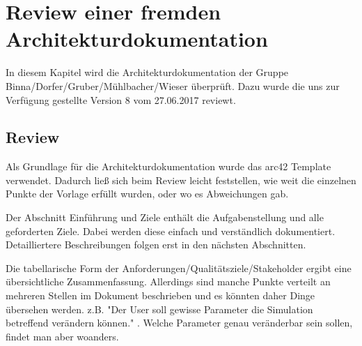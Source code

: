 
\chapter{Review einer fremden Architekturdokumentation}
\label{Review_einer_fremden_Architekturdokumentation}

In diesem Kapitel wird die Architekturdokumentation der Gruppe Binna/Dorfer/Gruber/Mühlbacher/Wieser überprüft.
Dazu wurde die uns zur Verfügung gestellte Version 8 vom 27.06.2017 reviewt.

\thispagestyle{standard}
\pagestyle{standard}

\section{Review}
\label{Review}

Als Grundlage für die Architekturdokumentation wurde das arc42 Template verwendet. Dadurch ließ sich beim Review leicht feststellen, wie weit die einzelnen Punkte der Vorlage erfüllt wurden, oder wo es Abweichungen gab.


Der Abschnitt Einführung und Ziele enthält die Aufgabenstellung und alle geforderten Ziele. Dabei werden diese einfach und verständlich dokumentiert. Detailliertere Beschreibungen folgen erst in den nächsten Abschnitten. 


Die tabellarische Form der Anforderungen/Qualitätsziele/Stakeholder ergibt eine übersichtliche Zusammenfassung. Allerdings sind manche Punkte verteilt an mehreren Stellen im Dokument beschrieben und es könnten daher Dinge übersehen werden. z.B. "Der User soll gewisse Parameter die Simulation betreffend verändern können." . Welche Parameter genau veränderbar sein sollen, findet man aber woanders.

